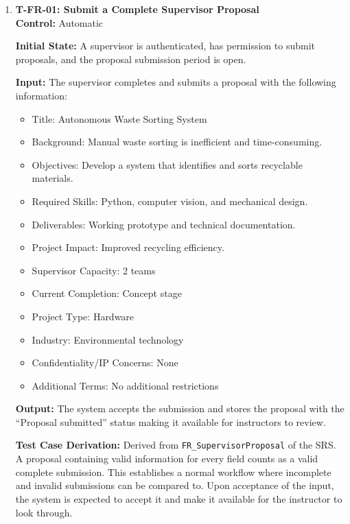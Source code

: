 \documentclass[12pt, titlepage]{article}
\begin{document}
\begin{enumerate}

\item \label{T-FR-01}\textbf{T-FR-01: Submit a Complete Supervisor Proposal}\\

\textbf{Control:} Automatic

\textbf{Initial State:} A supervisor is authenticated, has permission to submit proposals, and the proposal submission period is open.
					
\textbf{Input:} The supervisor completes and submits a proposal with the following information:
\begin{itemize}
    \item Title: Autonomous Waste Sorting System
    \item Background: Manual waste sorting is inefficient and time-consuming.
    \item Objectives: Develop a system that identifies and sorts recyclable
    materials.
    \item Required Skills: Python, computer vision, and mechanical design.
    \item Deliverables: Working prototype and technical documentation.
    \item Project Impact: Improved recycling efficiency.
    \item Supervisor Capacity: 2 teams
    \item Current Completion: Concept stage
    \item Project Type: Hardware
    \item Industry: Environmental technology
    \item Confidentiality/IP Concerns: None
    \item Additional Terms: No additional restrictions
\end{itemize}

\textbf{Output:} The system accepts the submission and stores the proposal with the ``Proposal submitted'' status making it available for instructors to review.

\textbf{Test Case Derivation:} Derived from \texttt{FR\_SupervisorProposal} of the SRS. A proposal containing valid information for every field counts as a valid complete submission. This establishes a normal workflow where incomplete and invalid submissions can be compared to. Upon acceptance of the input, the system is expected to accept it and make it available for the instructor to look through.


\end{enumerate}
\end{document}

